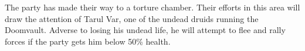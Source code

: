 The party has made their way to a torture chamber.
Their efforts in this area will draw the attention of Tarul Var, one of the undead druids running the Doomvault.
Adverse to losing his undead life, he will attempt to flee and rally forces if the party gets him below 50\% health.